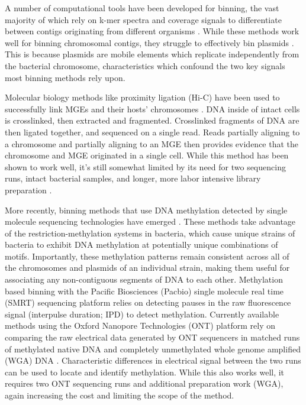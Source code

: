 A number of computational tools have been developed for binning, the vast majority of which rely on k-mer spectra and coverage signals to differentiate between contigs originating from different organisms \citep{Yue2020-cm}. While these methods work well for binning chromosomal contigs, they struggle to effectively bin plasmids \citep{Beaulaurier2018-mu}. This is because plasmids are mobile elements which replicate independently from the bacterial chromosome, characteristics which confound the two key signals most binning methods rely upon.

Molecular biology methods like proximity ligation (Hi-C) have been used to successfully link MGEs and their hosts’ chromosomes \citep{Burton2014-yu}. DNA inside of intact cells is crosslinked, then extracted and fragmented. Crosslinked fragments of DNA are then ligated together, and sequenced on a single read. Reads partially aligning to a chromosome and partially aligning to an MGE then provides evidence that the chromosome and MGE originated in a single cell. While this method has been shown to work well, it’s still somewhat limited by its need for two sequencing runs, intact bacterial samples, and longer, more labor intensive library preparation \citep{Beyi2021-tv}.

More recently, binning methods that use DNA methylation detected by single molecule sequencing technologies have emerged \citep{Beaulaurier2018-mu, Tourancheau2021-hv}. These methods take advantage of the restriction-methylation systems in bacteria, which cause unique strains of bacteria to exhibit DNA methylation at potentially unique combinations of motifs. Importantly, these methylation patterns remain consistent across all of the chromosomes and plasmids of an individual strain, making them useful for associating any non-contiguous segments of DNA to each other. Methylation based binning with the Pacific Biosciences (Pacbio) single molecule real time (SMRT) sequencing platform relies on detecting pauses in the raw fluorescence signal (interpulse duration; IPD) to detect methylation. Currently available methods using the Oxford Nanopore Technologies (ONT) platform rely on comparing the raw electrical data generated by ONT sequencers in matched runs of methylated native DNA and completely unmethylated whole genome amplified (WGA) DNA \citep{Tourancheau2021-hv}. Characteristic differences in electrical signal between the two runs can be used to locate and identify methylation. While this also works well, it requires two ONT sequencing runs and additional preparation work (WGA), again increasing the cost and limiting the scope of the method.

